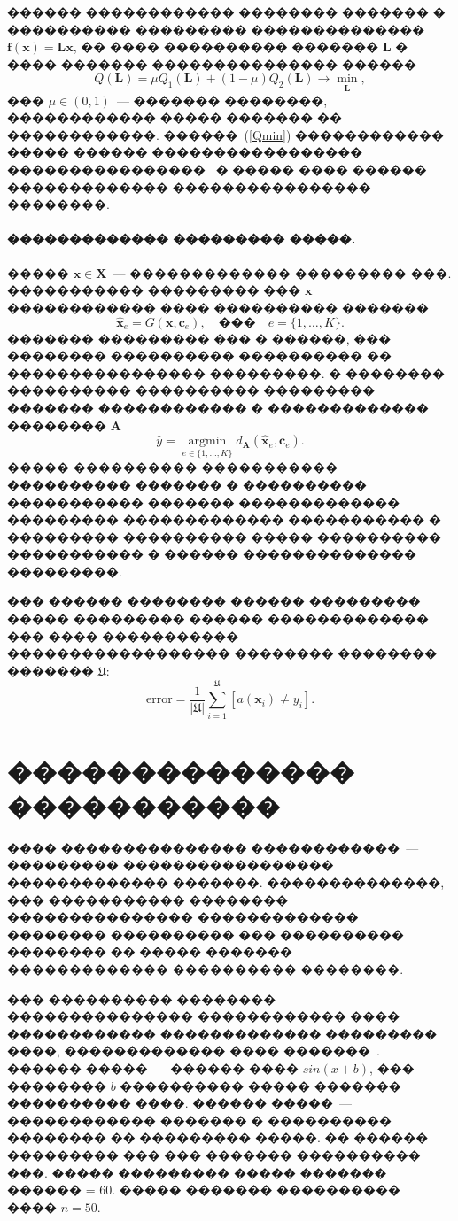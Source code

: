 \documentclass[12pt,twoside, notitlepage]{article}
\begin{document}
������ ������������ �������� ������� � ���������� ��������� �������������� $\mathbf{f}(\mathbf{x}) = \mathbf{Lx}$, �� ���� ���������� ������� $\mathbf{L}$ � ���� ������� ��������������� ������
\begin{equation}
\label{Qmin}
    Q(\mathbf{L}) = \mu Q_1(\mathbf{L}) + (1 - \mu) Q_2(\mathbf{L}) \rightarrow \min_{\mathbf{L}},
\end{equation}
��� $\mu \in (0, 1)$~--- ������� ��������, ������������ ����� ������� �� ������������.
������~(\ref{Qmin}) ������������ ����� ������ ����������������� ����������������~\cite{vandenberghe1996semidefinite} � ����� ���� ������ ������������� ���������������� ��������.

\paragraph{������������� ��������� �����.}

����� $\mathbf{x} \in \mathbf{X}$~--- ������������� ��������� ���. ����������� ��������� ��� $\mathbf{x}$ ������������ ���� ���������� �������
\[
    \mathbf{\hat{x}}_e = G(\mathbf{x}, \mathbf{c}_e), \quad \text{���} \quad e = \{1, \dots, K\}.
\]
������� ��������� ��� � ������, ��� �������� ���������� ���������� �� ���������������� ���������. � �������� ���������� ���������� ��������� ������� ������������ � ������������� �������� $\mathbf{A}$
\[
    \hat{y} = \mathop{\text{argmin}}\limits_{e \in \{1, \dots, K\}}d_\mathbf{A}(\mathbf{\hat{x}}_e, \mathbf{c}_e).
\]
����� ���������� ����������� ���������� ������� � ���������� ����������� ������� ������������� ��������� ������������� ����������� � ��������� ���������� ����� ���������� ����������� � ������ �������������� ���������.

��� ������ �������� ������ ��������� ����� ��������� ������ ������������� ��� ���� ����������� ������������������ �������� �������� ������� $\mathfrak{U}$:
\[
    \text{error} = \frac1{|\mathfrak{U}|} \sum_{i = 1} ^ {|\mathfrak{U}|} [a(\mathbf{x}_i) \ne y_i].
\]

\section{�������������� �����������}
���� ��������������� ������������~--- ��������� ����������������� ������������� �������.
��������������, ��� ����������� �������� ��������������� ������������� �������� ���������� ��� ���������� �������� �� ����� ������� ������������� ���������� ��������.

��� ���������� �������� ��������������� ������������ ���� ������������ ������������� ��������� ����, ������������� ���� �������~\cite{Isachenko2015code}.
������ �����~--- ������ ���� $sin(x + b)$, ��� �������� $b$ ���������� ����� ������� ���������� ����.
������ �����~--- ������������ ������� � ���������� �������� �� ��������� �����.
�� ������ ��������� ��� ��� ������� ���������� ���.
����� ��������� ����� ������� ������ = 60.
����� ������� ���������� ���� $n = 50$.
\end{document}
